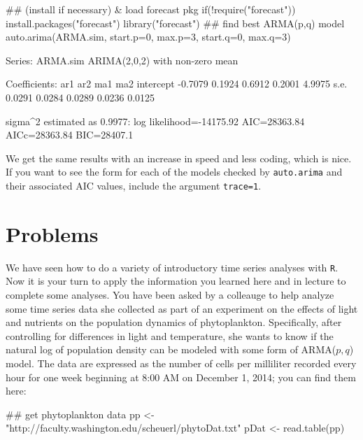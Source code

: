 \begin{Schunk}
\begin{Sinput}
 ## (install if necessary) & load forecast pkg
 if(!require("forecast")) {
     install.packages("forecast")
     library("forecast")
 }
 ## find best ARMA(p,q) model
 auto.arima(ARMA.sim, start.p=0, max.p=3, start.q=0, max.q=3)
\end{Sinput}
\begin{Soutput}
Series: ARMA.sim 
ARIMA(2,0,2) with non-zero mean 

Coefficients:
          ar1     ar2     ma1     ma2  intercept
      -0.7079  0.1924  0.6912  0.2001     4.9975
s.e.   0.0291  0.0284  0.0289  0.0236     0.0125

sigma^2 estimated as 0.9977:  log likelihood=-14175.92
AIC=28363.84   AICc=28363.84   BIC=28407.1
\end{Soutput}
\end{Schunk}

\noindent We get the same results with an increase in speed and less coding, which is nice.  If you want to see the form for each of the models checked by \texttt{auto.arima} and their associated AIC values, include the argument \texttt{trace=1}.


\clearpage
\renewcommand{\rightmark}{}
\section*{Problems}

We have seen how to do a variety of introductory time series analyses with \texttt{R}.  Now it is your turn to apply the information you learned here and in lecture to complete some analyses.  You have been asked by a colleauge to help analyze some time series data she collected as part of an experiment on the effects of light and nutrients on the population dynamics of phytoplankton.  Specifically, after controlling for differences in light and temperature, she wants to know if the natural log of population density can be modeled with some form of ARMA($p,q$) model.  The data are expressed as the number of cells per milliliter recorded every hour for one week beginning at 8:00 AM on December 1, 2014; you can find them here:

\begin{Schunk}
\begin{Sinput}
 ## get phytoplankton data
 pp <- "http://faculty.washington.edu/scheuerl/phytoDat.txt"
 pDat <- read.table(pp)
\end{Sinput}
\end{Schunk}

